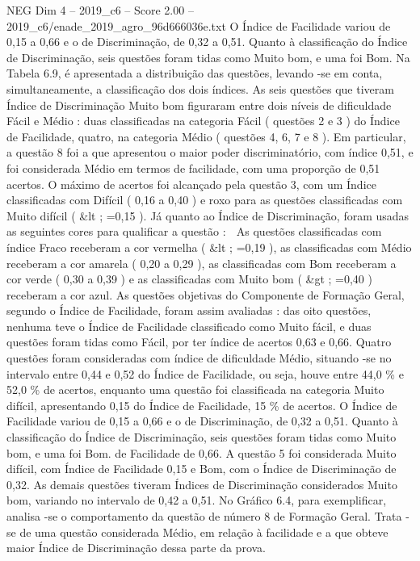 \begin{textsample}{NEG Dim 4 – 2019\_c6 – Score 2.00 – 2019\_c6/enade\_2019\_agro\_96d666036e.txt}
O Índice de Facilidade variou de 0,15 a 0,66 e o de Discriminação, de 0,32 a 0,51.
Quanto à classificação do Índice de Discriminação, seis questões foram tidas como Muito bom, e uma foi Bom.
Na Tabela 6.9, é apresentada a distribuição das questões, levando -se em conta, simultaneamente, a classificação dos dois índices.
As seis questões que tiveram Índice de Discriminação Muito bom figuraram entre dois níveis de dificuldade Fácil e Médio : duas classificadas na categoria Fácil ( questões 2 e 3 ) do Índice de Facilidade, quatro, na categoria Médio ( questões 4, 6, 7 e 8 ).
Em particular, a questão 8 foi a que apresentou o maior poder discriminatório, com índice 0,51, e foi considerada Médio em termos de facilidade, com uma proporção de 0,51 acertos.
O máximo de acertos foi alcançado pela questão 3, com um Índice classificadas com Difícil ( 0,16 a 0,40 ) e roxo para as questões classificadas com Muito difícil ( \&lt ; =0,15 ).
Já quanto ao Índice de Discriminação, foram usadas as seguintes cores para qualificar a questão :  As questões classificadas com índice Fraco receberam a cor vermelha ( \&lt ; =0,19 ), as classificadas com Médio receberam a cor amarela ( 0,20 a 0,29 ), as classificadas com Bom receberam a cor verde ( 0,30 a 0,39 ) e as classificadas com Muito bom ( \&gt ; =0,40 ) receberam a cor azul.
As questões objetivas do Componente de Formação Geral, segundo o Índice de Facilidade, foram assim avaliadas : das oito questões, nenhuma teve o Índice de Facilidade classificado como Muito fácil, e duas questões foram tidas como Fácil, por ter índice de acertos 0,63 e 0,66.
Quatro questões foram consideradas com índice de dificuldade Médio, situando -se no intervalo entre 0,44 e 0,52 do Índice de Facilidade, ou seja, houve entre 44,0 \% e 52,0 \% de acertos, enquanto uma questão foi classificada na categoria Muito difícil, apresentando 0,15 do Índice de Facilidade, 15 \% de acertos.
O Índice de Facilidade variou de 0,15 a 0,66 e o de Discriminação, de 0,32 a 0,51.
Quanto à classificação do Índice de Discriminação, seis questões foram tidas como Muito bom, e uma foi Bom. de Facilidade de 0,66.
A questão 5 foi considerada Muito difícil, com Índice de Facilidade 0,15 e Bom, com o Índice de Discriminação de 0,32.
As demais questões tiveram Índices de Discriminação considerados Muito bom, variando no intervalo de 0,42 a 0,51.
No Gráfico 6.4, para exemplificar, analisa -se o comportamento da questão de número 8 de Formação Geral.
Trata -se de uma questão considerada Médio, em relação à facilidade e a que obteve maior Índice de Discriminação dessa parte da prova.

\end{textsample}
